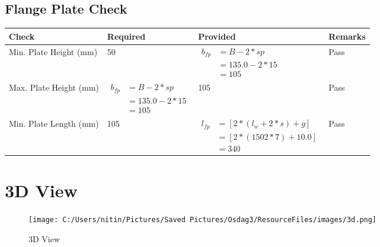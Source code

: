 \documentclass{article}%
\begin{document}
%
\newpage%
\subsection{Flange Plate Check}%
\label{subsec:FlangePlateCheck}%
\renewcommand{\arraystretch}{1.2}%
\begin{longtable}{|p{4cm}|p{6cm}|p{5.5cm}|p{1.5cm}|}%
\hline%
\rowcolor{OsdagGreen}%
Check&Required&Provided&Remarks\\%
\hline%
\endhead%
\hline%
Min. Plate Height (mm)&50&$\begin{aligned} b_{fp} &= {B - 2*sp} \\ &= {135.0 - 2 * 15} \\ &=105\end{aligned}$&Pass\\%
\hline%
Max. Plate Height (mm)&$\begin{aligned} b_{fp} &= {B - 2*sp} \\ &= {135.0 - 2 * 15} \\ &=105\end{aligned}$&105&Pass\\%
\hline%
Min. Plate Length (mm)&105&$\begin{aligned} l_{fp} & = [2*(l_{w} + 2*s) + g]\\ &= [2*(1502*7) +10.0]\\ &=340\end{aligned}$&Pass\\%
\hline%
\end{longtable}

%
%
\newpage%
\section{3D View}%
\label{sec:3DView}%


\begin{figure}[h!]%
\centering%
\texttt{[image: C:/Users/nitin/Pictures/Saved Pictures/Osdag3/ResourceFiles/images/3d.png]}%
\caption{3D View}%
\end{figure}

%
\end{document}
